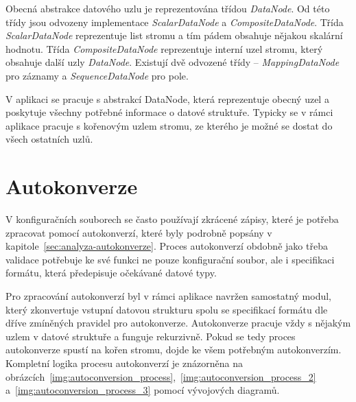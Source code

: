 \documentclass[FM,bw,DP]{tulthesis}
\begin{document}
Obecná abstrakce datového uzlu je reprezentována třídou \textit{DataNode}. Od této třídy jsou odvozeny implementace \textit{ScalarDataNode} a \textit{CompositeDataNode}. Třída \textit{ScalarDataNode} reprezentuje list stromu a tím pádem obsahuje nějakou skalární hodnotu. Třída \textit{CompositeDataNode} reprezentuje interní uzel stromu, který obsahuje další uzly \textit{DataNode}. Existují dvě odvozené třídy -- \textit{MappingDataNode} pro záznamy a \textit{SequenceDataNode} pro pole.

V aplikaci se pracuje s abstrakcí DataNode, která reprezentuje obecný uzel a poskytuje všechny potřebné informace o datové struktuře. Typicky se v rámci aplikace pracuje s kořenovým uzlem stromu, ze kterého je možné se dostat do všech ostatních uzlů.

\section{Autokonverze}

V konfiguračních souborech se často používají zkrácené zápisy, které je potřeba zpracovat pomocí autokonverzí, které byly podrobně popsány v kapitole~\ref{sec:analyza-autokonverze}. Proces autokonverzí obdobně jako třeba validace potřebuje ke své funkci ne pouze konfigurační soubor, ale i specifikaci formátu, která předepisuje očekávané datové typy.

Pro zpracování autokonverzí byl v rámci aplikace navržen samostatný modul, který zkonvertuje vstupní datovou strukturu spolu se specifikací formátu dle dříve zmíněných pravidel pro autokonverze. Autokonverze pracuje vždy s nějakým uzlem v datové struktuře a funguje rekurzivně. Pokud se tedy proces autokonverze spustí na kořen stromu, dojde ke všem potřebným autokonverzím. Kompletní logika procesu autokonverzí je znázorněna na obrázcích~\ref{img:autoconversion_process},~\ref{img:autoconversion_process_2}  a~\ref{img:autoconversion_process_3} pomocí vývojových diagramů. 

\clearpage
\end{document}

